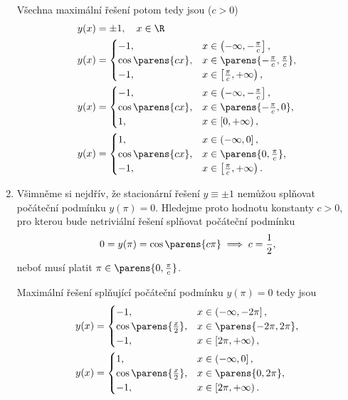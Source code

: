 \documentclass[answers]{exam}
\begin{document}
\begin{questions}
\begin{solution}
\begin{enumerate}[label=(\roman*)]
	  	Všechna maximální řešení potom tedy jsou ($c > 0$)
	  	\begin{align*}
	  		y(x) &= \pm1, \quad x \in \R
	  		\\
	  		y(x) &=
	  		\begin{cases}
	  			-1, \quad &x \in \left( -\infty, -\frac{\pi}{c} \right],
	  			\\
	  			\cos \parens{cx}, &x \in \parens{-\frac{\pi}{c}, \frac{\pi}{c}},
	  			\\
	  			-1, \quad &x \in \left[\frac{\pi}{c}, +\infty \right),
	  		\end{cases}
	  		\\
	  		y(x) &=
	  		\begin{cases}
	  			-1, \quad &x \in \left( -\infty, -\frac{\pi}{c} \right],
	  			\\
	  			\cos \parens{cx}, &x \in \parens{-\frac{\pi}{c}, 0},
	  			\\
	  			1, \quad &x \in \left[0, +\infty \right),
	  		\end{cases}	  		
	  		\\
	  		y(x) &=
	  		\begin{cases}
	  			1, \quad &x \in \left( -\infty, 0 \right],
	  			\\
	  			\cos \parens{cx}, &x \in \parens{0, \frac{\pi}{c}},
	  			\\
	  			- 1, \quad &x \in \left[\frac{\pi}{c}, +\infty \right).
	  		\end{cases}	 	  		
	  	\end{align*}
	  \item 
	  	Všimněme si nejdřív, že stacionární řešení $y \equiv \pm1$ nemůžou splňovat počáteční podmínku $y(\pi) = 0$. Hledejme proto hodnotu konstanty $c > 0$, pro kterou bude netriviální řešení splňovat počáteční podmínku
	  	\begin{equation*}
	  		0 = y(\pi) = \cos \parens{c \pi} \implies c = \frac{1}{2},
	  	\end{equation*}
	  	neboť musí platit $\pi \in \parens{0, \frac{\pi}{c}}$.
	  	
	  	Maximální řešení splňující počáteční podmínku $y(\pi) = 0$ tedy jsou
	  	\begin{align*}
	  		y(x) &=
	  		\begin{cases}
	  			-1, \quad &x \in \left( -\infty, -2\pi \right],
	  			\\
	  			\cos \parens{\frac{x}{2}}, &x \in \parens{-2\pi, 2\pi},
	  			\\
	  			-1, \quad &x \in \left[2\pi, +\infty \right),
	  		\end{cases}
	  		\\
	  		y(x) &=
	  		\begin{cases}
	  			1, \quad &x \in \left( -\infty, 0 \right],
	  			\\
	  			\cos \parens{\frac{x}{2}}, &x \in \parens{0, 2\pi},
	  			\\
	  			- 1, \quad &x \in \left[2\pi, +\infty \right).
	  		\end{cases}	 	  		
	  	\end{align*}


\end{enumerate}
\end{solution}
\end{questions}
\end{document}
